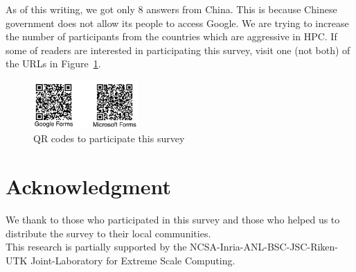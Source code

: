 \documentclass[sigconf,nonacm]{acmart}
\begin{document}
As of this writing, we got only 8 answers from China. This is because 
Chinese government does not allow its people to access Google. We are
trying to increase the number of participants from the
countries which are aggressive in HPC.  
If some of readers are interested in participating this survey, visit
one (not both) of the URLs in Figure~\ref{fig:qrcodes}.

\begin{figure}[htb]
\begin{center}
\includegraphics[width=4cm]{figs/QR-codes.pdf}
\caption{QR codes to participate this survey}
\label{fig:qrcodes}
\end{center}
\end{figure}

\section*{Acknowledgment}
  We thank to those who participated in this survey and those who
  helped us to distribute the survey to their local communities.\\
  This research is partially supported by the
  NCSA-Inria-ANL-BSC-JSC-Riken-UTK Joint-Laboratory for Extreme Scale
  Computing\cite{JLESC}.



\end{document}
